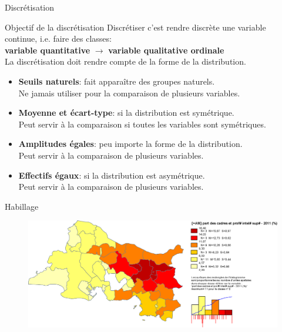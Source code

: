 \begin{frame}{Discrétisation}

\begin{block}{Objectif de la discrétisation}
  Discrétiser c'est rendre discrète une variable continue, i.e. faire des classes: \\
  \textbf{variable quantitative} $\rightarrow$ \textbf{variable qualitative ordinale} \\
  La discrétisation doit rendre compte de la forme de la distribution.
\end{block}


\begin{itemize}
  \item \textbf{Seuils naturels}: fait apparaître des groupes naturels. \\ 
  Ne jamais utiliser pour la comparaison de plusieurs variables.
  \item \textbf{Moyenne et écart-type}: si la distribution est symétrique. \\
  Peut servir à la comparaison si toutes les variables sont symétriques.
  \item \textbf{Amplitudes égales}: peu importe la forme de la distribution. \\
  Peut servir à la comparaison de plusieurs variables.
  \item \textbf{Effectifs égaux}: si la distribution est asymétrique. \\
  Peut servir à la comparaison de plusieurs variables.
\end{itemize}

\end{frame}


\begin{frame}{Habillage}

\begin{figure}
\includegraphics[width=12cm]{CarteCadres.png}
\end{figure}

\end{frame}

